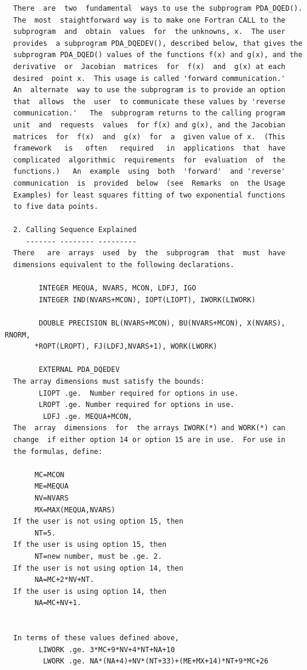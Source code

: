 \documentclass[11pt,twoside]{article}
\begin{document}
\begin{verbatim}
  There  are  two  fundamental  ways to use the subprogram PDA_DQED().
  The  most  staightforward way is to make one Fortran CALL to the
  subprogram  and  obtain  values  for  the unknowns, x.  The user
  provides  a subprogram PDA_DQEDEV(), described below, that gives the
  subprogram PDA_DQED() values of the functions f(x) and g(x), and the
  derivative  or  Jacobian  matrices  for  f(x)  and  g(x) at each
  desired  point x.  This usage is called 'forward communication.'
  An  alternate  way to use the subprogram is to provide an option
  that  allows  the  user  to communicate these values by 'reverse
  communication.'   The  subprogram returns to the calling program
  unit  and  requests  values  for f(x) and g(x), and the Jacobian
  matrices  for  f(x)  and  g(x)  for  a  given value of x.  (This
  framework   is   often   required   in  applications  that  have
  complicated  algorithmic  requirements  for  evaluation  of  the
  functions.)   An  example  using  both  'forward'  and 'reverse'
  communication  is  provided  below  (see  Remarks  on  the Usage
  Examples) for least squares fitting of two exponential functions
  to five data points.

  2. Calling Sequence Explained
     ------- -------- ---------
  There   are  arrays  used  by  the  subprogram  that  must  have
  dimensions equivalent to the following declarations.

        INTEGER MEQUA, NVARS, MCON, LDFJ, IGO
        INTEGER IND(NVARS+MCON), IOPT(LIOPT), IWORK(LIWORK)

        DOUBLE PRECISION BL(NVARS+MCON), BU(NVARS+MCON), X(NVARS), RNORM,
       *ROPT(LROPT), FJ(LDFJ,NVARS+1), WORK(LWORK)

        EXTERNAL PDA_DQEDEV
  The array dimensions must satisfy the bounds:
        LIOPT .ge.  Number required for options in use.
        LROPT .ge. Number required for options in use.
         LDFJ .ge. MEQUA+MCON,
  The  array  dimensions  for  the arrays IWORK(*) and WORK(*) can
  change  if either option 14 or option 15 are in use.  For use in
  the formulas, define:

       MC=MCON
       ME=MEQUA
       NV=NVARS
       MX=MAX(MEQUA,NVARS)
  If the user is not using option 15, then
       NT=5.
  If the user is using option 15, then
       NT=new number, must be .ge. 2.
  If the user is not using option 14, then
       NA=MC+2*NV+NT.
  If the user is using option 14, then
       NA=MC+NV+1.


  In terms of these values defined above,
        LIWORK .ge. 3*MC+9*NV+4*NT+NA+10
         LWORK .ge. NA*(NA+4)+NV*(NT+33)+(ME+MX+14)*NT+9*MC+26


\end{verbatim}
\end{document}

